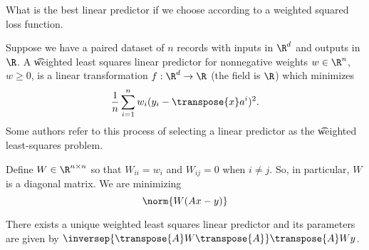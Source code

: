 

What is the best linear predictor if we choose according to a weighted squared loss function.


Suppose we have a paired dataset of $n$ records with inputs in $\R^d$ and outputs in $\R$.
A \t{weighted least squares linear predictor} for nonnegative weights $w \in \R^n$, $w \geq 0$, is a linear transformation $f: \R^d \to \R$ (the field is $\R$) which minimizes
\[
  \frac{1}{n} \sum_{i = 1}^{n} w_i(y_i - \transpose{x}a^i)^2.
\]
Some authors refer to this process of selecting a linear predictor as the \t{weighted least-squares problem}.

Define $W \in \R^{n \times n}$ so that $W_{ii} = w_i$ and $W_{ij} = 0$ when $i \neq j$.
So, in particular, $W$ is a diagonal matrix.
We are minimizing
\[
  \norm{W(Ax - y)}
\]


\begin{proposition}
There exists a unique weighted least squares linear predictor and its parameters are given by $\inversep{\transpose{A}W\transpose{A}}\transpose{A}Wy$.
\end{proposition}



\blankpage
